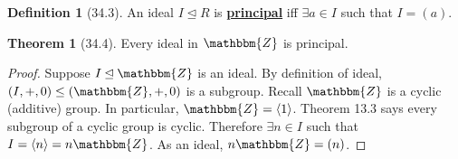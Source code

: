 \documentclass{article}
\newcommand{\Z}{\mathbbm{Z}}
\newcommand{\define}[1]{\textbf{\underline{#1}}}
\theoremstyle{definition}
\newtheorem*{defn}{Definition}
\newtheorem*{thm}{Theorem}
\theoremstyle{remark}
\newcommand{\cyc}[1]{\langle#1\rangle}
\newcommand{\ideal}{\unlhd}
\begin{document}
{{            \begin{defn}[34.3]
                An ideal $I \ideal R$ is \define{principal} iff $\exists a \in I$ such that $I=(a)$.
            \end{defn}
            
            \begin{thm}[34.4]
                Every ideal in $\Z$ is principal.
            \end{thm}
            
            \begin{proof}
                Suppose $I\ideal \Z$ is an ideal. By definition of ideal, $(I,+,0) \leq (\Z,+,0)$ is a subgroup. Recall $\Z$ is a cyclic (additive) group. In particular, $\Z=\cyc{1}$. Theorem 13.3 says every subgroup of a cyclic group is cyclic. Therefore $\exists n\in I$ such that $I=\cyc{n}=n\Z$. As an ideal, $n\Z=(n)$.
            \end{proof}
        }
    }
    
\end{document}
